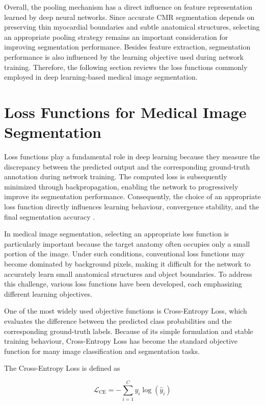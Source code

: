 Overall, the pooling mechanism has a direct influence on feature representation learned by deep neural networks. Since accurate CMR segmentation depends on preserving thin myocardial boundaries and subtle anatomical structures, selecting an appropriate pooling strategy remains an important consideration for improving segmentation performance. Besides feature extraction, segmentation performance is also influenced by the learning objective used during network training. Therefore, the following section reviews the loss functions commonly employed in deep learning-based medical image segmentation.

\section{Loss Functions for Medical Image Segmentation}
\label{sec:loss-functions}

Loss functions play a fundamental role in deep learning because they measure the discrepancy between the predicted output and the corresponding ground-truth annotation during network training. The computed loss is subsequently minimized through backpropagation, enabling the network to progressively improve its segmentation performance. Consequently, the choice of an appropriate loss function directly influences learning behaviour, convergence stability, and the final segmentation accuracy \citep{Jadon2020,Ma2021}.

In medical image segmentation, selecting an appropriate loss function is particularly important because the target anatomy often occupies only a small portion of the image. Under such conditions, conventional loss functions may become dominated by background pixels, making it difficult for the network to accurately learn small anatomical structures and object boundaries. To address this challenge, various loss functions have been developed, each emphasizing different learning objectives.

One of the most widely used objective functions is Cross-Entropy Loss, which evaluates the difference between the predicted class probabilities and the corresponding ground-truth labels. Because of its simple formulation and stable training behaviour, Cross-Entropy Loss has become the standard objective function for many image classification and segmentation tasks.

The Cross-Entropy Loss is defined as

\begin{equation}
	\mathcal{L}_{\mathrm{CE}}=-\sum_{i=1}^{C} y_i\log(\hat{y}_i)
	\label{eq:cross-entropy}
\end{equation}

